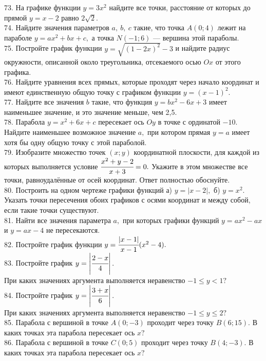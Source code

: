 \documentclass[12pt]{article}
\begin{document}
73. На графике функции $y=3x^2$ найдите все точки, расстояние от которых до прямой $y=x-2$ равно $2\sqrt{2}.$\\
74. Найдите значения параметров $a,\ b,\ c$ такие, что точка $A(0;4)$ лежит на параболе $y=ax^2+bx+c,$ а точка $N(-1;6)$ --- вершина этой параболы.\\
75. Постройте график функции $y=\sqrt{(1-2x)^2}-3$ и найдите радиус окружности, описанной около треугольника, отсекаемого осью $Ox$ от этого графика.\\
76. Найдите уравнения всех прямых, которые проходят через начало координат и имеют единственную общую точку с графиком функции $y=(x-1)^2.$\\
77. Найдите все значения $b$ такие, что функция $y=bx^2-6x+3$ имеет наименьшее значение, и это значение меньше, чем 2,5.\\
78. Парабола $y=x^2+6x+c$ пересекает ось $Oy$ в точке с ординатой $-10.$ Найдите наименьшее возможное значение $a,$ при котором прямая $y=a$ имеет хотя бы одну общую точку с этой параболой.\\
79. Изобразите множество точек $(x;y)$ координатной плоскости, для каждой из которых выполняется условие $\cfrac{x^2+y-2}{x+3}=0.$ Укажите в этом множестве все точки, равноудалённые от осей координат. Ответ полностью обоснуйте.\\
80. Построить на одном чертеже графики функций а) $y=|x-2|,$ б) $y=x^2.$\\
Указать точки пересечения обоих графиков с осями координат и между собой, если такие точки существуют.\\
81. Найти все значения параметра $a,$ при которых графики функций $y=ax^2-ax$ и $y=ax-4$ не пересекаются.\\
82. Постройте график функции $y=\cfrac{|x-1|}{x-1}(x^2-4).$\\
83. Постройте график $y=\left|\cfrac{2-x}{4}\right|.$\\
При каких значениях аргумента выполняется неравенство $-1\leqslant y<1?$\\
84. Постройте график $y=\left|\cfrac{3+x}{6}\right|.$\\
При каких значениях аргумента выполняется неравенство $-1\leqslant y\leqslant2?$\\
85. Парабола с вершиной в точке $A(0;-3)$ проходит через точку $B(6;15).$ В каких точках эта парабола пересекает ось $x?$\\
86. Парабола с вершиной в точке $C(0;5)$ проходит через точку $B(4;-3).$ В каких точках эта парабола пересекает ось $x?$\\
\end{document}
